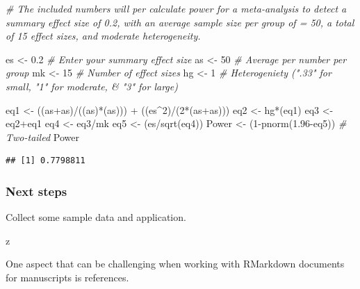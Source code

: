 \documentclass[
]{book}
\newenvironment{Shaded}{\begin{snugshade}}{\end{snugshade}}
\newcommand{\CommentTok}[1]{\textcolor[rgb]{0.56,0.35,0.01}{\textit{#1}}}
\newcommand{\DecValTok}[1]{\textcolor[rgb]{0.00,0.00,0.81}{#1}}
\newcommand{\FloatTok}[1]{\textcolor[rgb]{0.00,0.00,0.81}{#1}}
\newcommand{\FunctionTok}[1]{\textcolor[rgb]{0.00,0.00,0.00}{#1}}
\newcommand{\NormalTok}[1]{#1}
\newcommand{\OtherTok}[1]{\textcolor[rgb]{0.56,0.35,0.01}{#1}}
\newcommand{\SpecialCharTok}[1]{\textcolor[rgb]{0.00,0.00,0.00}{#1}}
\begin{document}
\begin{Shaded}
\begin{Highlighting}[]
\CommentTok{\# The included numbers will per calculate power for a meta{-}analysis to detect a summary effect size of 0.2, with an average sample size per group of = 50, a total of 15 effect sizes, and moderate heterogeneity.}

\NormalTok{es }\OtherTok{\textless{}{-}} \FloatTok{0.2} \CommentTok{\# Enter your summary effect size}
\NormalTok{as }\OtherTok{\textless{}{-}} \DecValTok{50}  \CommentTok{\# Average per number per group}
\NormalTok{mk }\OtherTok{\textless{}{-}} \DecValTok{15}  \CommentTok{\# Number of effect sizes}
\NormalTok{hg }\OtherTok{\textless{}{-}} \DecValTok{1}   \CommentTok{\# Heterogeniety (".33" for small, "1" for moderate, \& "3" for large)}

\NormalTok{eq1 }\OtherTok{\textless{}{-}}\NormalTok{ ((as}\SpecialCharTok{+}\NormalTok{as)}\SpecialCharTok{/}\NormalTok{((as)}\SpecialCharTok{*}\NormalTok{(as))) }\SpecialCharTok{+}\NormalTok{ ((es}\SpecialCharTok{\^{}}\DecValTok{2}\NormalTok{)}\SpecialCharTok{/}\NormalTok{(}\DecValTok{2}\SpecialCharTok{*}\NormalTok{(as}\SpecialCharTok{+}\NormalTok{as)))}
\NormalTok{eq2 }\OtherTok{\textless{}{-}}\NormalTok{ hg}\SpecialCharTok{*}\NormalTok{(eq1)}
\NormalTok{eq3 }\OtherTok{\textless{}{-}}\NormalTok{ eq2}\SpecialCharTok{+}\NormalTok{eq1}
\NormalTok{eq4 }\OtherTok{\textless{}{-}}\NormalTok{ eq3}\SpecialCharTok{/}\NormalTok{mk}
\NormalTok{eq5 }\OtherTok{\textless{}{-}}\NormalTok{ (es}\SpecialCharTok{/}\FunctionTok{sqrt}\NormalTok{(eq4))}
\NormalTok{Power }\OtherTok{\textless{}{-}}\NormalTok{ (}\DecValTok{1}\SpecialCharTok{{-}}\FunctionTok{pnorm}\NormalTok{(}\FloatTok{1.96}\SpecialCharTok{{-}}\NormalTok{eq5)) }\CommentTok{\# Two{-}tailed}
\NormalTok{Power}
\end{Highlighting}
\end{Shaded}

\begin{verbatim}
## [1] 0.7798811
\end{verbatim}

\hypertarget{next-steps}{%
\subsubsection{Next steps}\label{next-steps}}

Collect some sample data and application.

z

One aspect that can be challenging when working with RMarkdown documents for manuscripts is references.
\end{document}
